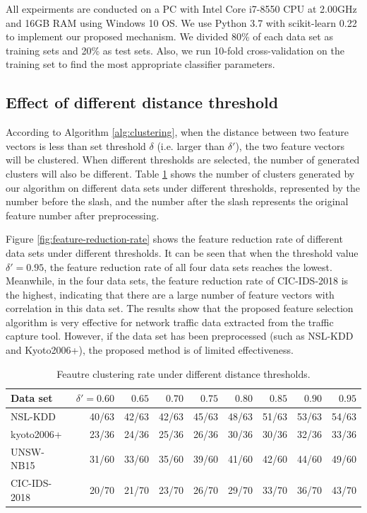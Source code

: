 \documentclass{ieeeaccess}
\theoremstyle{definition}
\begin{document}
All expeirments are conducted on a PC with Intel Core i7-8550 CPU at 2.00GHz and 16GB RAM using Windows 10 OS. We use Python 3.7 with scikit-learn 0.22 \cite{sklearn} to implement our proposed mechanism. We divided 80\% of each data set as training sets and 20\% as test sets. Also, we run 10-fold cross-validation on the training set to find the most appropriate classifier parameters.

\subsection{Effect of different distance threshold}

According to Algorithm \ref{alg:clustering}, when the distance between two feature vectors is less than set threshold $\delta$ (i.e. larger than $\delta'$), the two feature vectors will be clustered. When different thresholds are selected, the number of generated clusters will also be different. Table \ref{tab:clustering-rate} shows the number of clusters generated by our algorithm on different data sets under different thresholds, represented by the number before the slash, and the number after the slash represents the original feature number after preprocessing.

Figure \ref{fig:feature-reduction-rate} shows the feature reduction rate of different data sets under different thresholds. It can be seen that when the threshold value $\delta' = 0.95$, the feature reduction rate of all four data sets reaches the lowest. Meanwhile, in the four data sets, the feature reduction rate of CIC-IDS-2018 is the highest, indicating that there are a large number of feature vectors with correlation in this data set. The results show that the proposed feature selection algorithm is very effective for network traffic data extracted from the traffic capture tool. However, if the data set has been preprocessed (such as NSL-KDD and Kyoto2006+), the proposed method is of limited effectiveness.

\begin{table}[htbp]
    \centering
    \caption{Feautre clustering rate under different distance thresholds.}
    \begin{tabular}{lrrrrrrrr}
        \toprule
        Data set & $\delta'=0.60$ & $0.65$ & $0.70$ & $0.75$ & $0.80$ & $0.85$ & $0.90$ & $0.95$ \\
        \midrule
        NSL-KDD & 40/63 & 42/63 & 42/63 & 45/63 & 48/63 & 51/63 & 53/63 & 54/63 \\
        kyoto2006+ & 23/36 & 24/36 & 25/36 & 26/36 & 30/36 & 30/36 & 32/36 & 33/36 \\
        UNSW-NB15 & 31/60 & 33/60 & 35/60 & 39/60 & 41/60 & 42/60 & 44/60 & 49/60 \\
        CIC-IDS-2018 & 20/70 & 21/70 & 23/70 & 26/70 & 29/70 & 33/70 & 36/70 & 43/70 \\
        \bottomrule
    \end{tabular}%
    \label{tab:clustering-rate}%
\end{table}%
\end{document}
